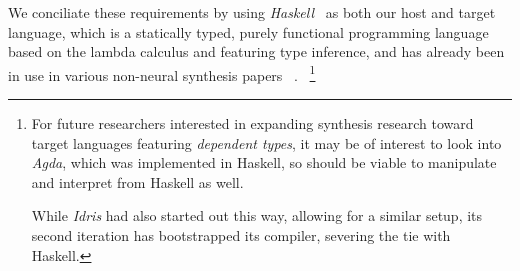 \documentclass{article}
\begin{document}


We conciliate these requirements
by using \emph{Haskell}~\citep{jones2003haskell} as both our host and target language,
which is a statically typed, purely functional programming language based on the lambda calculus and featuring type inference,
and has already been in use in various non-neural synthesis papers%
~\citep{synquid,hornclauses,scythe,gissurarson2018suggesting}.%
~\footnote{
    For future researchers interested in expanding synthesis research toward target languages featuring \emph{dependent types},
    it may be of interest to look into \emph{Agda},
    which was implemented in Haskell,
    so should be viable to manipulate and interpret from Haskell as well.

    While \emph{Idris} had also started out this way,
    allowing for a similar setup,
    its second iteration has bootstrapped its compiler,
    severing the tie with Haskell.
}
\end{document}
